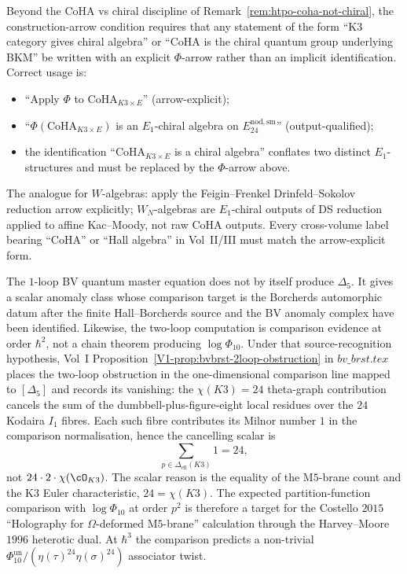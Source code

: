 \begin{remark}
\label{rem:htpo-construction-arrow}

Beyond the CoHA vs chiral discipline of
Remark~\ref{rem:htpo-coha-not-chiral}, the construction-arrow condition
requires
that any statement of the form ``K3 category gives chiral algebra'' or
``CoHA is the chiral quantum group underlying BKM'' be written with an
explicit $\Phi$-arrow rather than an implicit identification. Correct
usage is:
\begin{itemize}
\item ``Apply $\Phi$ to $\mathrm{CoHA}_{K3\times E}$'' (arrow-explicit);
\item ``$\Phi(\mathrm{CoHA}_{K3\times E})$ is an $E_1$-chiral algebra
on $E^{\mathrm{nod,sm}}_{24}$'' (output-qualified);
\item the identification ``$\mathrm{CoHA}_{K3\times E}$ is a chiral
algebra'' conflates two distinct $E_1$-structures and must be replaced
by the $\Phi$-arrow above.
\end{itemize}
The analogue for $W$-algebras: apply the
Feigin--Frenkel Drinfeld--Sokolov reduction arrow explicitly;
$W_N$-algebras are $E_1$-chiral outputs of DS reduction applied to
affine Kac--Moody, not raw CoHA outputs. Every cross-volume label
bearing ``CoHA'' or ``Hall algebra'' in Vol~II/III must match the
arrow-explicit form.
\end{remark}

\begin{remark}
\label{rem:htpo-two-loop}
The $1$-loop BV quantum master equation does not by itself produce
$\Delta_5$. It gives a scalar anomaly class whose comparison target is
the Borcherds automorphic datum after the finite Hall--Borcherds source
and the BV anomaly complex have been identified. Likewise, the
two-loop computation is comparison evidence at order $\hbar^2$, not a
chain theorem producing $\log\Phi_{10}$. Under that source-recognition
hypothesis, Vol~I Proposition~\ref{V1-prop:bvbrst-2loop-obstruction} in
$bv\_brst.tex$ places the two-loop obstruction in the one-dimensional
comparison line mapped to $[\Delta_5]$ and records its vanishing: the
$\chi(K3) = 24$ theta-graph contribution cancels the
sum of the dumbbell-plus-figure-eight local residues over the
$24$ Kodaira \(I_1\) fibres.
Each such fibre contributes its Milnor number \(1\) in the comparison
normalisation, hence the cancelling scalar is
\[
\sum_{p\in \Delta_{\mathrm{ell}}(K3)}1=24,
\]
not \(24\cdot2\cdot\chi(\cO_{K3})\). The scalar reason is the equality of the
M$5$-brane count and the K3 Euler characteristic,
$24=\chi(K3)$. The expected partition-function comparison with
$\log\Phi_{10}$ at order $p^2$ is therefore a target for the
Costello $2015$ ``Holography for $\Omega$-deformed M$5$-brane''
\cite{Costello2015omega} calculation through the Harvey--Moore $1996$
heterotic dual. At $\hbar^3$ the comparison predicts a non-trivial
\(\Phi_{10}^{\mathrm{un}}/(\eta(\tau)^{24}\eta(\sigma)^{24})\)
associator twist.
\end{remark}
